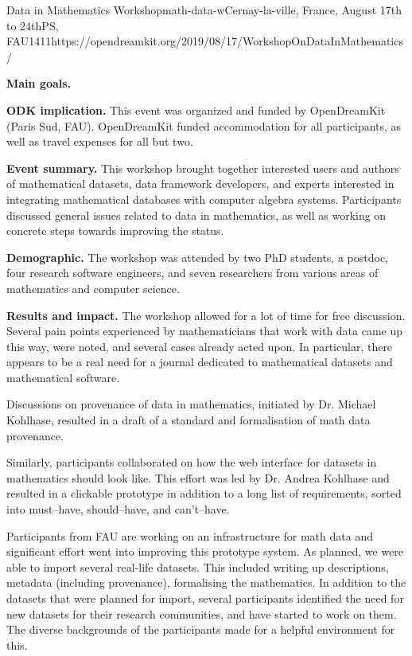 \begin{event}{Data in Mathematics Workshop}{math-data-w}{Cernay-la-ville, France, August 17th to 24th}{PS, FAU}{14}{11}{https://opendreamkit.org/2019/08/17/WorkshopOnDataInMathematics/}

\textbf{Main goals.} 

\textbf{ODK implication.} This event was organized and funded by OpenDreamKit (Paris Sud, FAU). 
OpenDreamKit funded accommodation for all participants, as well as travel expenses for all but two.

\textbf{Event summary.} This workshop brought together interested users and authors of mathematical datasets, 
data framework developers, and experts interested in integrating mathematical databases with computer algebra systems.
Participants discussed general issues related to data in mathematics,
as well as working on concrete steps towards improving the status.

\textbf{Demographic.} The workshop was attended by 
two PhD students,
a postdoc,
four research software engineers,
and seven researchers from various areas of mathematics and computer science.

\textbf{Results and impact.} 
The workshop allowed for a lot of time for free discussion.
Several pain points experienced by mathematicians that work with data came up this way,
were noted, and several cases already acted upon.
In particular, there appears to be a real need for a journal dedicated to 
mathematical datasets and mathematical software.

Discussions on provenance of data in mathematics,
initiated by Dr. Michael Kohlhase, resulted in 
a draft of a standard and formalisation of math data provenance.

Similarly, participants collaborated on how the web interface
for datasets in mathematics should look like.
This effort was led by Dr. Andrea Kohlhase and resulted in 
a clickable prototype in addition to a long list of requirements,
sorted into must--have, should--have, and can't--have.

Participants from FAU are working on an infrastructure for math data and
significant effort went into improving this prototype system.
As planned, we were able to import several real-life datasets.
This included writing up descriptions, metadata (including provenance), 
formalising the mathematics.
In addition to the datasets that were planned for import,
several participants identified the need for new datasets for their 
research communities, and have started to work on them.
The diverse backgrounds of the participants made for a helpful
environment for this.


\end{event}

